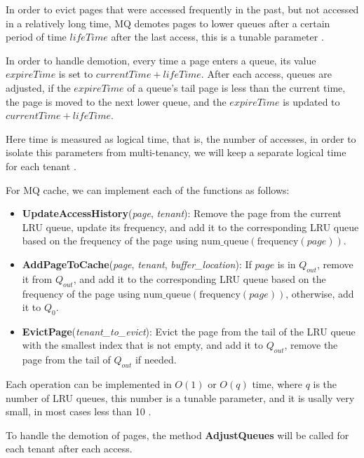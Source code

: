 In order to evict pages that were accessed frequently in the past, but not accessed in a relatively long time,
MQ demotes pages to lower queues after a certain period of time $lifeTime$ after the last access, this is
a tunable parameter \cite{mq-article}.

In order to handle demotion, every time a page enters a queue, its value $expireTime$ is set to $currentTime + lifeTime$.
After each access, queues are adjusted, if the $expireTime$ of a queue's tail page is less than the current time, the page
is moved to the next lower queue, and the $expireTime$ is updated to $currentTime + lifeTime$.

Here time is measured as logical time, that is, the number of accesses, in order to isolate 
this parameters from multi-tenancy, we will keep a separate logical time for each tenant \cite{mq-article}.

For MQ cache, we can implement each of the functions as follows:

\begin{itemize}
    \item \textbf{UpdateAccessHistory}(\textit{page}, \textit{tenant}): Remove the page from the
    current LRU queue, update its frequency, and add it to the corresponding LRU queue based on the
    frequency of the page using $\text{num\_queue}(\text{frequency}(page))$.
    \item \textbf{AddPageToCache}(\textit{page}, \textit{tenant}, \textit{buffer\_location}): If 
    $page$ is in $Q_{out}$, remove it from $Q_{out}$, and add it to the corresponding LRU queue based
    on the frequency of the page using $\text{num\_queue}(\text{frequency}(page))$, otherwise, add it
    to $Q_0$.
    \item \textbf{EvictPage}(\textit{tenant\_to\_evict}): Evict the page from the tail of the LRU queue with the
    smallest index that is not empty, and add it to $Q_{out}$, remove the page from the tail of $Q_{out}$ if needed.
\end{itemize}

Each operation can be implemented in $O(1)$ or $O(q)$ time, where $q$ is the number of LRU queues,
this number is a tunable parameter, and it is usally very small, in most cases less than 10 \cite{mq-article}.

To handle the demotion of pages, the method \textbf{AdjustQueues} will be called for each tenant after each access.

